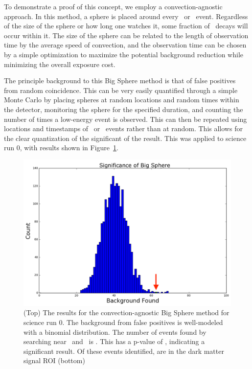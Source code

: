 To demonstrate a proof of this concept, we employ a convection-agnostic approach. In this method, a sphere is placed around every \Po~or \BiPo~event. Regardless of the size of the sphere or how long one watches it, some fraction of \Pb~decays will occur within it. The size of the sphere can be related to the length of observation time by the average speed of convection, and the observation time can be chosen by a simple optimization to maximize the potential background reduction while minimizing the overall exposure cost.

The principle background to this Big Sphere method is that of false positives from random coincidence. This can be very easily quantified through a simple Monte Carlo by placing spheres at random locations and random times within the detector, monitoring the sphere for the specified duration, and counting the number of times a low-energy event is observed. This can then be repeated using locations and timestamps of \Po~or \BiPo~events rather than at random. This allows for the clear quantization of the significant of the result. This was applied to science run 0, with results shown in Figure~\ref{fig:bs_sr0}.

\begin{figure}[htb]
\centering
\includegraphics[width=\textwidth]{figures/rnveto/BigSphere}
\caption{ (Top) The results for the convection-agnostic Big Sphere method for science run 0. The background from false positives is well-modeled with a binomial distribution. The number of events found by searching near \Po~and \BiPo~is . This has a p-value of , indicating a significant result. Of these events identified,  are in the dark matter signal ROI (bottom)}\label{fig:bs_sr0}
\end{figure}

